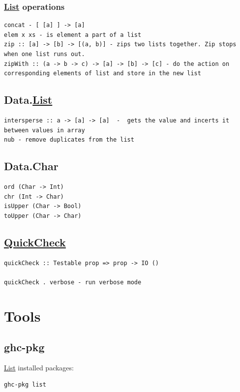 \documentclass[11pt]{article}
\begin{document}
\subsubsection{\hyperref[org874a6e0]{List} operations}
\label{sec:orga6786e0}
\begin{verbatim}
concat - [ [a] ] -> [a]
elem x xs - is element a part of a list
zip :: [a] -> [b] -> [(a, b)] - zips two lists together. Zip stops when one list runs out.
zipWith :: (a -> b -> c) -> [a] -> [b] -> [c] - do the action on corresponding elements of list and store in the new list
\end{verbatim}

\subsection{Data.\hyperref[org874a6e0]{List}}
\label{sec:org9008c67}
\begin{verbatim}
intersperse :: a -> [a] -> [a]  -  gets the value and incerts it between values in array
nub - remove duplicates from the list
\end{verbatim}

\subsection{Data.Char}
\label{sec:org8a4c4c2}
\begin{verbatim}
ord (Char -> Int)
chr (Int -> Char)
isUpper (Char -> Bool)
toUpper (Char -> Char)
\end{verbatim}

\subsection{\hyperref[org1fdb89a]{QuickCheck}}
\label{sec:orgee53822}
\begin{verbatim}
quickCheck :: Testable prop => prop -> IO ()

quickCheck . verbose - run verbose mode
\end{verbatim}

\section{Tools}
\label{sec:org4a626f0}
\subsection{ghc-pkg}
\label{sec:orge2d306e}

\hyperref[org874a6e0]{List} installed packages:\\
\begin{verbatim}
ghc-pkg list
\end{verbatim}
\end{document}
